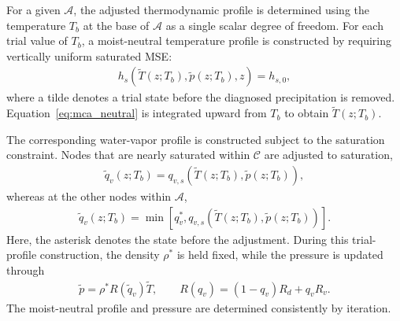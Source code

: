 For a given $\mathcal{A}$, the adjusted thermodynamic profile is determined using the temperature $T_b$ at the base of $\mathcal{A}$ as a single scalar degree of freedom.
For each trial value of $T_b$, a moist-neutral temperature profile is constructed by requiring vertically uniform saturated MSE:
%
\begin{align}
 h_s(\widetilde{T}(z;T_b),\widetilde{p}(z;T_b),z) = h_{s,0},
 \label{eq:mca_neutral}
\end{align}
%
where a tilde denotes a trial state before the diagnosed precipitation is removed.
Equation~\eqref{eq:mca_neutral} is integrated upward from $T_b$ to obtain $\widetilde{T}(z;T_b)$.

The corresponding water-vapor profile is constructed subject to the saturation constraint.
Nodes that are nearly saturated within $\mathcal{C}$ are adjusted to saturation,
%
\begin{align}
 \widetilde{q}_v(z;T_b)
 =
 q_{v,s}\left(\widetilde{T}(z;T_b),\widetilde{p}(z;T_b)\right),
\end{align}
%
whereas at the other nodes within $\mathcal{A}$,
%
\begin{align}
 \widetilde{q}_v(z;T_b)
 =
 \min \left[
 q_v^*,
 q_{v,s}\left(\widetilde{T}(z;T_b),\widetilde{p}(z;T_b)\right)
 \right].
\label{eq:mca_qv}
\end{align}
%
Here, the asterisk denotes the state before the adjustment.
During this trial-profile construction, the density $\rho^*$ is held fixed, while the pressure is updated through
%
\begin{align*}
 \widetilde{p} = \rho^* R(\widetilde{q}_v)\widetilde{T}, \qquad
 R(q_v) = (1-q_v)R_d + q_v R_v.
\end{align*}
%
The moist-neutral profile and pressure are determined consistently by iteration.

